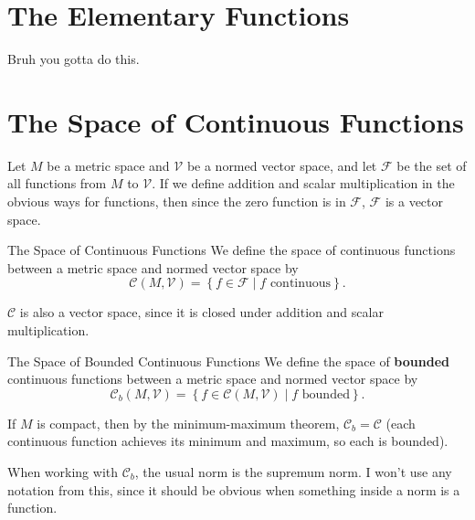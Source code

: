 \documentclass[10pt]{report}
\begin{document}

\section{The Elementary Functions}

{\color{red}Bruh you gotta do this.}




\section{The Space of Continuous Functions}

Let $M$ be a metric space and $\mathcal{V}$ be a normed vector space, and let $\mathcal{F}$ be the set of all functions from $M$ to $\mathcal{V}$. If we define addition and scalar multiplication in the obvious ways for functions, then since the zero function is in $\mathcal{F}$, $\mathcal{F}$ is a vector space.

\begin{defn}{The Space of Continuous Functions}{}
We define the space of continuous functions between a metric space and normed vector space by
\[
	\mathcal{C}(M,\mathcal{V}) = \left\{ f \in \mathcal{F} \;|\; f \text{ continuous} \right\}.
\] 
\end{defn}

$\mathcal{C}$ is also a vector space, since it is closed under addition and scalar multiplication.

\begin{defn}{The Space of Bounded Continuous Functions}{}
We define the space of \textbf{bounded} continuous functions between a metric space and normed vector space by
\[
	\mathcal{C}_b(M, \mathcal{V}) = \left\{ f \in \mathcal{C}(M, \mathcal{V}) \;|\; f \text{ bounded} \right\}.
\] 
\end{defn}

If $M$ is compact, then by the minimum-maximum theorem, $\mathcal{C}_b = \mathcal{C}$ (each continuous function achieves its minimum and maximum, so each is bounded).

When working with $\mathcal{C}_b$, the usual norm is the supremum norm. I won't use any notation from this, since it should be obvious when something inside a norm is a function.
\end{document}
